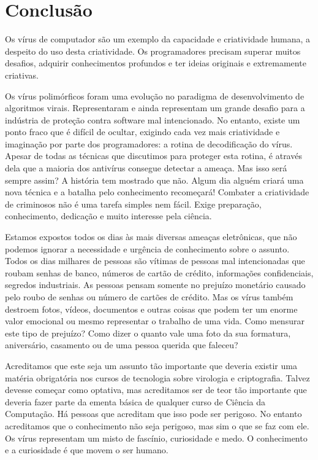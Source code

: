 \chapter{Conclusão}

Os vírus de computador são um exemplo da capacidade e criatividade humana, a despeito do uso desta criatividade. Os programadores precisam superar muitos desafios, adquirir conhecimentos profundos e ter ideias originais e extremamente criativas.

Os vírus polimórficos foram uma evolução no paradigma de desenvolvimento de algoritmos virais. Representaram e ainda representam um grande desafio para a indústria de proteção contra software mal intencionado. No entanto, existe um ponto fraco que é difícil de ocultar, exigindo cada vez mais criatividade e imaginação por parte dos programadores: a rotina de decodificação do vírus. Apesar de todas as técnicas que discutimos para proteger esta rotina, é através dela que a maioria dos antivírus consegue detectar a ameaça. Mas isso será sempre assim? A história tem mostrado que não. Algum dia alguém criará uma nova técnica e a batalha pelo conhecimento recomeçará! Combater a criatividade de criminosos não é uma tarefa simples nem fácil. Exige preparação, conhecimento, dedicação e muito interesse pela ciência.

Estamos expostos todos os dias às mais diversas ameaças eletrônicas, que não podemos ignorar a necessidade e urgência de conhecimento sobre o assunto. Todos os dias milhares de pessoas são vítimas de pessoas mal intencionadas que roubam senhas de banco, números de cartão de crédito, informações confidenciais, segredos industriais. As pessoas pensam somente no prejuízo monetário causado pelo roubo de senhas ou número de cartões de crédito. Mas os vírus também destroem fotos, vídeos, documentos e outras coisas que podem ter um enorme valor emocional ou mesmo representar o trabalho de uma vida. Como mensurar este tipo de prejuízo? Como dizer o quanto vale uma foto da sua formatura, aniversário, casamento ou de uma pessoa querida que faleceu?

Acreditamos que este seja um assunto tão importante que deveria existir uma matéria obrigatória nos cursos de tecnologia sobre virologia e criptografia. Talvez devesse começar como optativa, mas acreditamos ser de teor tão importante que deveria fazer parte da ementa básica de qualquer curso de Ciência da Computação. Há pessoas que acreditam que isso pode ser perigoso. No entanto acreditamos que o conhecimento não seja perigoso, mas sim o que se faz com ele. Os vírus representam um misto de fascínio, curiosidade e medo. O conhecimento e a curiosidade é que movem o ser humano.

